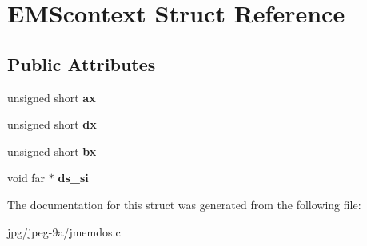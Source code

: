 \hypertarget{struct_e_m_scontext}{\section{E\+M\+Scontext Struct Reference}
\label{struct_e_m_scontext}
}
\subsection*{Public Attributes}
\begin{DoxyCompactItemize}
\item 
\hypertarget{struct_e_m_scontext_ab1a85d2ff0bf69aa3daad36e742cf757}{unsigned short {\bfseries ax}}\label{struct_e_m_scontext_ab1a85d2ff0bf69aa3daad36e742cf757}

\item 
\hypertarget{struct_e_m_scontext_aee8f592e3beedae16d64c8b69bbc313a}{unsigned short {\bfseries dx}}\label{struct_e_m_scontext_aee8f592e3beedae16d64c8b69bbc313a}

\item 
\hypertarget{struct_e_m_scontext_a563d27986fa97db36b43ef51ecc4c9d1}{unsigned short {\bfseries bx}}\label{struct_e_m_scontext_a563d27986fa97db36b43ef51ecc4c9d1}

\item 
\hypertarget{struct_e_m_scontext_a443b38ca200b15128af15a1ae1968c2e}{void far $\ast$ {\bfseries ds\+\_\+si}}\label{struct_e_m_scontext_a443b38ca200b15128af15a1ae1968c2e}

\end{DoxyCompactItemize}


The documentation for this struct was generated from the following file\+:\begin{DoxyCompactItemize}
\item 
jpg/jpeg-\/9a/jmemdos.\+c\end{DoxyCompactItemize}
